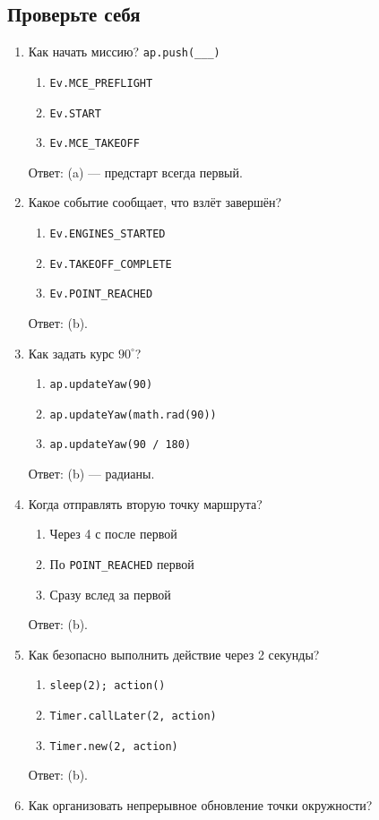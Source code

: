 \subsection{Проверьте себя}
\begin{enumerate}
  \item Как начать миссию? \verb|ap.push(___)|
    \begin{enumerate}[label=(\alph*)] \item \verb|Ev.MCE_PREFLIGHT| \item \verb|Ev.START| \item \verb|Ev.MCE_TAKEOFF| \end{enumerate}
    Ответ: (a) --- предстарт всегда первый.
  \item Какое событие сообщает, что взлёт завершён?
    \begin{enumerate}[label=(\alph*)] \item \verb|Ev.ENGINES_STARTED| \item \verb|Ev.TAKEOFF_COMPLETE| \item \verb|Ev.POINT_REACHED| \end{enumerate}
    Ответ: (b).
  \item Как задать курс $90^\circ$?
    \begin{enumerate}[label=(\alph*)] \item \verb|ap.updateYaw(90)| \item \verb|ap.updateYaw(math.rad(90))| \item \verb|ap.updateYaw(90 / 180)| \end{enumerate}
    Ответ: (b) --- радианы.
  \item Когда отправлять вторую точку маршрута?
    \begin{enumerate}[label=(\alph*)] \item Через 4 с после первой \item По \verb|POINT_REACHED| первой \item Сразу вслед за первой \end{enumerate}
    Ответ: (b).
  \item Как безопасно выполнить действие через 2 секунды?
    \begin{enumerate}[label=(\alph*)] \item \verb|sleep(2); action()| \item \verb|Timer.callLater(2, action)| \item \verb|Timer.new(2, action)| \end{enumerate}
    Ответ: (b).
  \item Как организовать непрерывное обновление точки окружности?

\end{enumerate}
